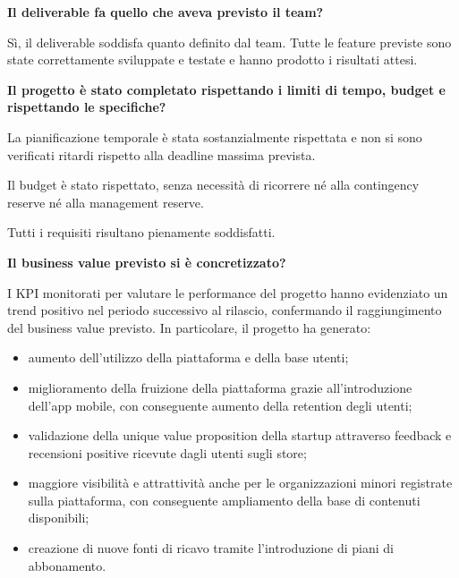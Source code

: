 \documentclass[11pt,a4paper]{article}
\providecommand{\tightlist}{\setlength{\itemsep}{0pt}\setlength{\parskip}{0pt}}
\begin{document}
{}

\medskip\noindent\textbf{Il deliverable fa quello che aveva previsto il team?}\par\smallskip

{Sì, il deliverable soddisfa quanto definito dal team. Tutte le feature previste sono state correttamente sviluppate e testate e hanno prodotto i risultati attesi.}

{}

\medskip\noindent\textbf{Il progetto è stato completato rispettando i limiti di tempo, budget e rispettando le specifiche?}\par\smallskip

{La pianificazione temporale è stata sostanzialmente rispettata e non si sono verificati ritardi rispetto alla deadline massima prevista.}

{Il budget è stato rispettato, senza necessità di ricorrere né alla contingency reserve né alla management reserve.}

{Tutti i requisiti risultano pienamente soddisfatti.}

{}

\medskip\noindent\textbf{Il business value previsto si è concretizzato?}\par\smallskip

{I KPI monitorati per valutare le performance del progetto hanno evidenziato un trend positivo nel periodo successivo al rilascio, confermando il raggiungimento del business value previsto. In particolare, il progetto ha generato:}

\begin{itemize}
\tightlist
\item
  {aumento dell’utilizzo della piattaforma e della base utenti;}
\item
  {miglioramento della fruizione della piattaforma grazie all’introduzione dell’app mobile, con conseguente aumento della retention degli utenti;}
\item
  {validazione della unique value proposition della startup attraverso feedback e recensioni positive ricevute dagli utenti sugli store;}
\item
  {maggiore visibilità e attrattività anche per le organizzazioni minori registrate sulla piattaforma, con conseguente ampliamento della base di contenuti disponibili;}
\item
  {creazione di nuove fonti di ricavo tramite l’introduzione di piani di abbonamento.}
\end{itemize}
\end{document}
